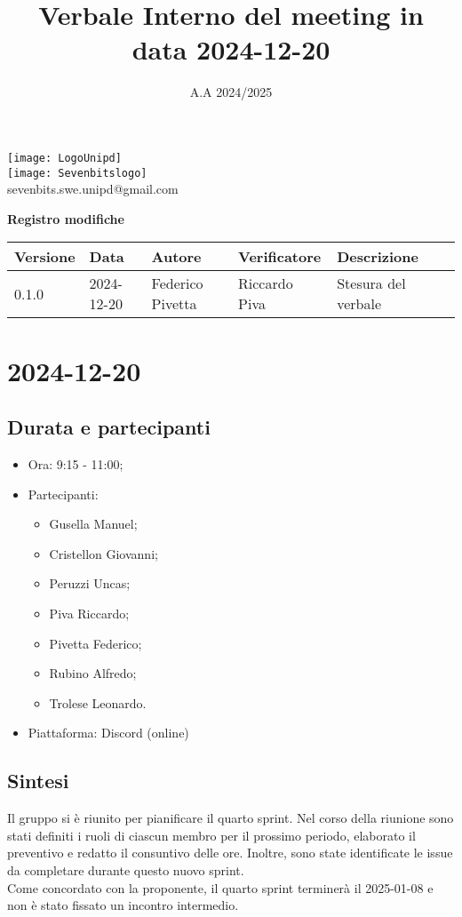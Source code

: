 \documentclass[10pt]{article}
\title{Verbale Interno del meeting in data 2024-12-20}
\date{A.A 2024/2025}
\begin{document}
\maketitle
\center 
\texttt{[image: LogoUnipd]}\\
\texttt{[image: Sevenbitslogo]}\\
sevenbits.swe.unipd@gmail.com\\
\vspace{2mm}

\textbf{Registro modifiche}\\
\vspace{2mm}
\begin{tabular}{|l|l|l|l|l|l|}
\hline
\textbf{Versione} & \textbf{Data} & \textbf{Autore} & \textbf{Verificatore} & \textbf{Descrizione} \\
\hline
0.1.0 & 2024-12-20 & Federico Pivetta & Riccardo Piva & Stesura del verbale\\
\hline
\end{tabular}

\newpage
\raggedright
\tableofcontents

\newpage
\section{2024-12-20}
\subsection{Durata e partecipanti}
\begin{itemize}
\item Ora: 9:15 - 11:00;
\item Partecipanti: 	
	\begin{itemize}
	    \item Gusella Manuel;
            \item Cristellon Giovanni;
            \item Peruzzi Uncas;
            \item Piva Riccardo;
            \item Pivetta Federico;
            \item Rubino Alfredo;
            \item Trolese Leonardo.
	\end{itemize}
\item Piattaforma: Discord (online)
\end{itemize}

\subsection{Sintesi}
Il gruppo si è riunito per pianificare il quarto sprint. Nel corso della riunione sono stati definiti i ruoli di ciascun membro per il prossimo periodo, elaborato il preventivo e redatto il consuntivo delle ore. Inoltre, sono state identificate le issue da completare durante questo nuovo sprint.\\
Come concordato con la proponente, il quarto sprint terminerà il 2025-01-08 e non è stato fissato un incontro intermedio.
\end{document}
